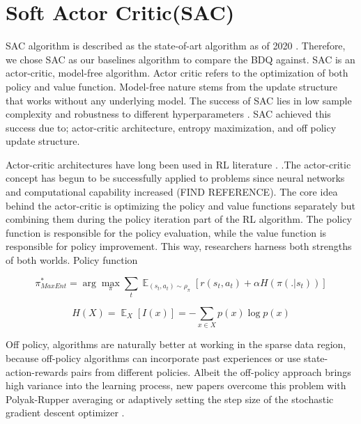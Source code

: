 \section{Soft Actor Critic(SAC)}


SAC algorithm is described as the state-of-art algorithm as of 2020 \cite{stable-baselines}. Therefore, we chose SAC as our baselines algorithm to compare the BDQ against. SAC is an actor-critic, model-free algorithm. Actor critic refers to the optimization of both policy and value function. Model-free nature stems from the update structure that works without any underlying model. The success of SAC lies in low sample complexity and robustness to different hyperparameters \cite{Haarnoja2018}. SAC achieved this success due to; actor-critic architecture, entropy maximization, and off policy update structure.


Actor-critic architectures have long been used in RL literature \cite{Konda2000}. \cite{Haarnoja2018}.The actor-critic concept has begun to be successfully applied to problems since neural networks and computational capability increased (FIND REFERENCE). The core idea behind the actor-critic is optimizing the policy and value functions separately but combining them during the policy iteration part of the RL algorithm. The policy function is responsible for the policy evaluation, while the value function is responsible for policy improvement. This way, researchers harness both strengths of both worlds. Policy function 


\begin{equation}
    \pi^*_{MaxEnt} = \arg\max_{\pi}\sum_t\mathop{\mathbb{E}}_{(s_t,a_t)\sim \rho_{\pi}}[r(s_t, a_t) + \alpha H(\pi(.|s_t))]
    \label{eq:maxentRL}
\end{equation}

\begin{equation}
    H(X) = \mathop{\mathbb{E}}_X[I(x)] = -\sum\limits_{x \in X} p(x)\log p(x)
\end{equation}

Off policy, algorithms are naturally better at working in the sparse data region, because off-policy algorithms can incorporate past experiences or use state-action-rewards pairs from different policies.  Albeit the off-policy approach brings high variance into the learning process, new papers overcome this problem with Polyak-Rupper averaging or adaptively setting the step size of the stochastic gradient descent optimizer \cite{Sutton2018}.

